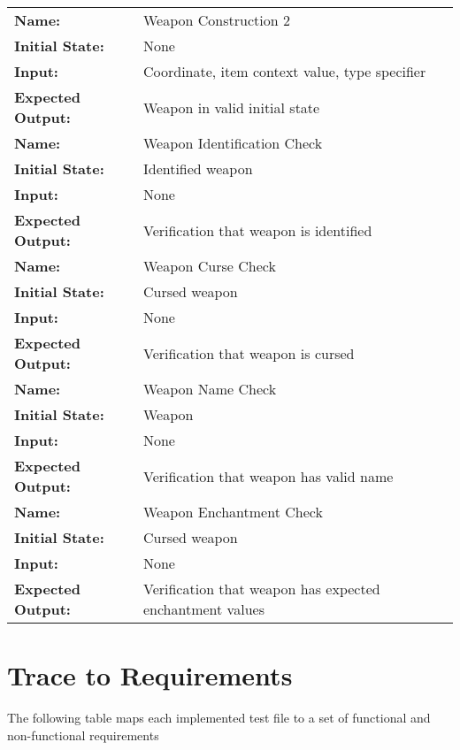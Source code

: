 \documentclass[12pt, titlepage]{article}
\newcommand{\newsection}[1]{\newpage\section{#1}}
\begin{document}
\begin{center}
\begin{longtable}{ l | p{10cm} }
				\hline
				\rule{0pt}{1.5em}\textbf{Name:} & Weapon Construction 2\\
				\textbf{Initial State:} & None\\
				\textbf{Input:} & Coordinate, item context value, type specifier\\
				\textbf{Expected Output:} & Weapon in valid initial state\\[0.6em]
				\hline
				\rule{0pt}{1.5em}\textbf{Name:} & Weapon Identification Check\\
				\textbf{Initial State:} & Identified weapon\\
				\textbf{Input:} & None\\
				\textbf{Expected Output:} & Verification that weapon is identified\\[0.6em]
				\hline
				\rule{0pt}{1.5em}\textbf{Name:} & Weapon Curse Check\\
				\textbf{Initial State:} & Cursed weapon\\
				\textbf{Input:} & None\\
				\textbf{Expected Output:} & Verification that weapon is cursed\\[0.6em]
				\hline
				\rule{0pt}{1.5em}\textbf{Name:} & Weapon Name Check\\
				\textbf{Initial State:} & Weapon\\
				\textbf{Input:} & None\\
				\textbf{Expected Output:} & Verification that weapon has valid name\\[0.6em]
				\hline
				\rule{0pt}{1.5em}\textbf{Name:} & Weapon Enchantment Check\\
				\textbf{Initial State:} & Cursed weapon\\
				\textbf{Input:} & None\\
				\textbf{Expected Output:} & Verification that weapon has expected enchantment values\\[0.6em]
				\hline

			\end{longtable}

		\end{center}

\newsection{Trace to Requirements} \label{Section_R_Trace}

	The following table maps each implemented test file to a set of functional and non-functional requirements 
\end{document}
